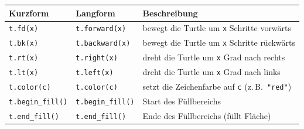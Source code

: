 
\clearpage
\begin{myoverview}
	\leavevmode
	\begin{table}[H]
		\centering
		\begin{tabular}{lll}
			\midrule
			\textbf{Kurzform}            & \textbf{Langform}            & \textbf{Beschreibung}                                                                                   \\
			\midrule
			\lstinline|t.fd(x)|          & \lstinline|t.forward(x)|     & bewegt die Turtle um \lstinline|x| Schritte vorwärts                                                    \\
			\lstinline|t.bk(x)|          & \lstinline|t.backward(x)|    & bewegt die Turtle um \lstinline|x| Schritte rückwärts                                                   \\
			\lstinline|t.rt(x)|          & \lstinline|t.right(x)|       & dreht die Turtle um \lstinline|x| Grad nach rechts                                                      \\
			\lstinline|t.lt(x)|          & \lstinline|t.left(x)|        & dreht die Turtle um \lstinline|x| Grad nach links                                                       \\
			\lstinline|t.color(c)|       & \lstinline|t.color(c)|       & setzt die Zeichenfarbe auf \lstinline|c| (z.\,B.\ \lstinline|"red"|)                                    \\
			\lstinline|t.begin_fill()|   & \lstinline|t.begin_fill()|   & Start des Füllbereichs                                                                                  \\
			\lstinline|t.end_fill()|     & \lstinline|t.end_fill()|     & Ende des Füllbereichs (füllt Fläche)                                                                    \\

\end{tabular}
\end{table}
\end{myoverview}

